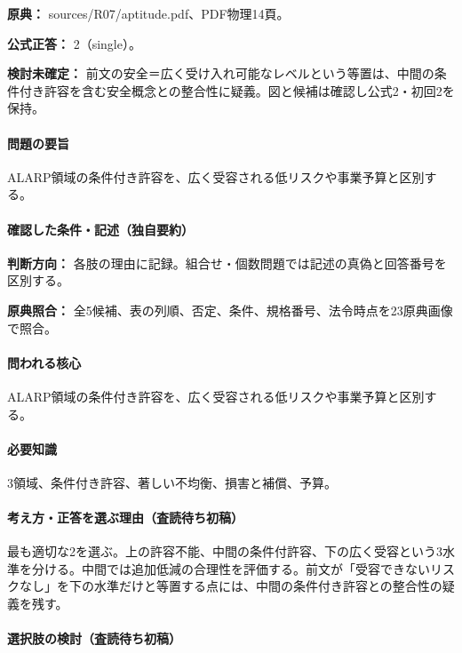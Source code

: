 \noindent\textbf{原典：} sources/R07/aptitude.pdf、PDF物理14頁。

\textbf{公式正答：} 2（single）。

\par\textbf{検討未確定：} 前文の安全＝広く受け入れ可能なレベルという等置は、中間の条件付き許容を含む安全概念との整合性に疑義。図と候補は確認し公式2・初回2を保持。

\paragraph{問題の要旨} ALARP領域の条件付き許容を、広く受容される低リスクや事業予算と区別する。

\paragraph{確認した条件・記述（独自要約）}\mbox{}\par

\noindent\textbf{判断方向：} 各肢の理由に記録。組合せ・個数問題では記述の真偽と回答番号を区別する。\par

\noindent\textbf{原典照合：} 全5候補、表の列順、否定、条件、規格番号、法令時点を23原典画像で照合。\par

\paragraph{問われる核心} ALARP領域の条件付き許容を、広く受容される低リスクや事業予算と区別する。

\paragraph{必要知識} 3領域、条件付き許容、著しい不均衡、損害と補償、予算。

\paragraph{考え方・正答を選ぶ理由（査読待ち初稿）} 最も適切な2を選ぶ。上の許容不能、中間の条件付許容、下の広く受容という3水準を分ける。中間では追加低減の合理性を評価する。前文が「受容できないリスクなし」を下の水準だけと等置する点には、中間の条件付き許容との整合性の疑義を残す。

\paragraph{選択肢の検討（査読待ち初稿）}\mbox{}\par

